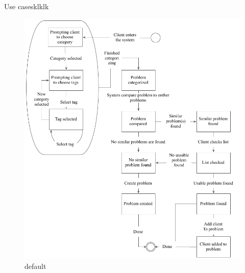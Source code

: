 Use casesklklk

\begin{figure}[htbp]
\begin{center}
 \includegraphics[scale=1]{input/application_domain_analysis/submit_problem_use_case}
\caption{default}
\label{default}
\end{center}
\end{figure}
